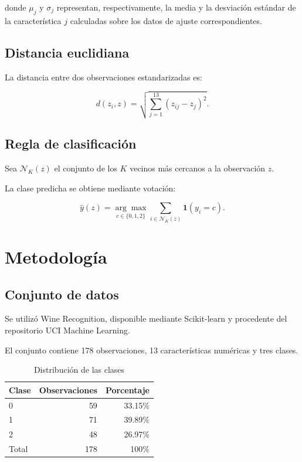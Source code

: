 ﻿\documentclass[11pt,a4paper]{article}
\begin{document}
donde $\mu_j$ y $\sigma_j$ representan,
respectivamente, la media y la desviación
estándar de la característica $j$ calculadas
sobre los datos de ajuste correspondientes.

\subsection{Distancia euclidiana}

La distancia entre dos observaciones
estandarizadas es:

\begin{equation}
d(z_i,z)=
\sqrt{\sum_{j=1}^{13}(z_{ij}-z_j)^2}.
\end{equation}

\subsection{Regla de clasificación}

Sea $\mathcal{N}_K(z)$ el conjunto de los
$K$ vecinos más cercanos a la observación $z$.

La clase predicha se obtiene mediante votación:

\begin{equation}
\hat y(z)=
\underset{c\in\{0,1,2\}}{\arg\max}
\sum_{i\in\mathcal{N}_K(z)}
\mathbf{1}(y_i=c).
\end{equation}

\section{Metodología}

\subsection{Conjunto de datos}

Se utilizó Wine Recognition, disponible mediante
Scikit-learn y procedente del repositorio UCI
Machine Learning.

El conjunto contiene 178 observaciones,
13 características numéricas y tres clases.

\begin{table}[H]
\centering
\caption{Distribución de las clases}
\begin{tabular}{lrr}
\toprule
Clase & Observaciones & Porcentaje \\
\midrule
0 & 59 & 33.15\% \\
1 & 71 & 39.89\% \\
2 & 48 & 26.97\% \\
\midrule
Total & 178 & 100\% \\
\bottomrule
\end{tabular}
\end{table}
\end{document}
